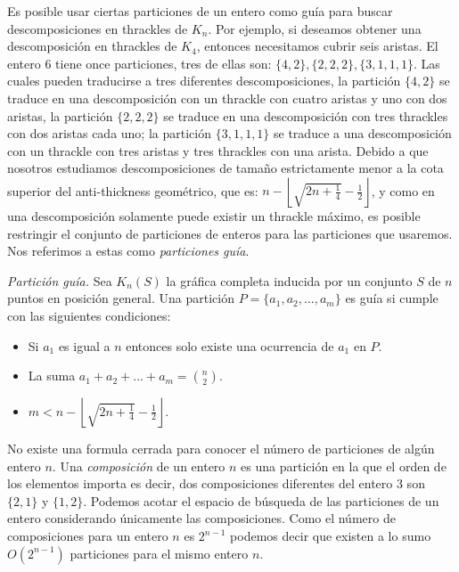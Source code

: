     Es posible usar ciertas particiones de un entero como guía para buscar
    descomposiciones en thrackles de $K_n$. Por ejemplo, si  deseamos obtener
    una descomposición en thrackles de $K_4$, entonces necesitamos cubrir
    seis aristas. El entero 6 tiene once particiones, tres de ellas son:
    $\{4,2\},\{2,2,2\},\{3,1,1,1\}$. Las cuales pueden traducirse a tres diferentes
    descomposiciones, la partición $\{4,2\}$ se traduce en una descomposición
    con un thrackle con cuatro aristas y uno con dos aristas, la partición
    $\{2,2,2\}$ se traduce en una descomposición con tres thrackles con dos
    aristas cada uno; la partición $\{3,1,1,1\}$ se traduce a una descomposición
    con un thrackle con tres aristas y tres thrackles con una arista. Debido a que
    nosotros estudiamos descomposiciones de tamaño estrictamente menor
    a la cota superior del anti-thickness geométrico, que es:
    $n - \left\lfloor\sqrt{2n+\frac{1}{4}} - \frac{1}{2}\right\rfloor$, y
    como en una descomposición solamente puede existir un thrackle máximo, es
    posible restringir el conjunto de particiones de enteros para
    las particiones que usaremos. Nos referimos a estas como
    \emph{particiones guía}.
    \begin{definition}{\emph{Partición guía.}} \label{definicion_particion_guia}
      Sea $K_n(S)$ la gráfica completa inducida por un conjunto $S$ de $n$
      puntos en posición general.
      Una partición $P=\{a_1,a_2,\dots,a_m\}$ es guía si cumple
      con las siguientes condiciones:
      \begin{itemize}
        \item Si $a_1$ es igual a $n$ entonces solo existe una ocurrencia de $a_1$ en $P$.
        \item La suma $a_1 + a_2 + \dots + a_m = \binom{n}{2}$.
        \item $m < n - \left\lfloor\sqrt{2n+\frac{1}{4}} - \frac{1}{2}\right\rfloor$.
      \end{itemize}
    \end{definition}

    No existe una formula cerrada para conocer el número de particiones de
    algún entero $n$. Una \emph{composición} de un entero $n$ es una partición
    en la que el orden de los elementos importa es decir, dos composiciones
    diferentes del entero 3 son $\{2,1\}$ y $\{1,2\}$. Podemos acotar el espacio de búsqueda de las
    particiones de un entero considerando únicamente las composiciones. Como el número de composiciones
    para un entero $n$ es $2^{n-1}$ podemos decir que existen a lo sumo $O(2^{n-1})$ particiones para el
    mismo entero $n$.

